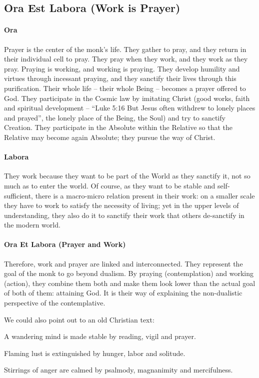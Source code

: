 \subsection*{Ora Est Labora (Work is Prayer)}

\paragraph{Ora}
Prayer is the center of the monk's life. They gather to pray, and they return in their individual cell to pray. They pray when they work, and they work as they pray. Praying is working, and working is praying. They develop humility and virtues through incessant praying, and they sanctify their lives through this purification. Their whole life – their whole Being – becomes a prayer offered to God. They participate in the Cosmic law by imitating Christ (good works, faith and spiritual development – ``Luke 5:16 But Jesus often withdrew to lonely places and prayed”, the lonely place of the Being, the Soul) and try to sanctify Creation. They participate in the Absolute within the Relative so that the Relative may become again Absolute; they pursue the way of Christ.

\paragraph{Labora}
They work because they want to be part of the World as they sanctify it, not so much as to enter the world. Of course, as they want to be stable and self-sufficient, there is a macro-micro relation present in their work: on a smaller scale they have to work to satisfy the necessity of living; yet in the upper levels of understanding, they also do it to sanctify their work that others de-sanctify in the modern world.

\paragraph{Ora Et Labora (Prayer and Work)}
Therefore, work and prayer are linked and interconnected. They represent the goal of the monk to go beyond dualism. By praying (contemplation) and working (action), they combine them both and make them look lower than the actual goal of both of them: attaining God. It is their way of explaining the non-dualistic perspective of the contemplative.

We could also point out to an old Christian text:

\begin{quotex}
A wandering mind is made stable by reading, vigil and prayer.

Flaming lust is extinguished by hunger, labor and solitude.

Stirrings of anger are calmed by psalmody, magnanimity and mercifulness.

\end{quotex}
